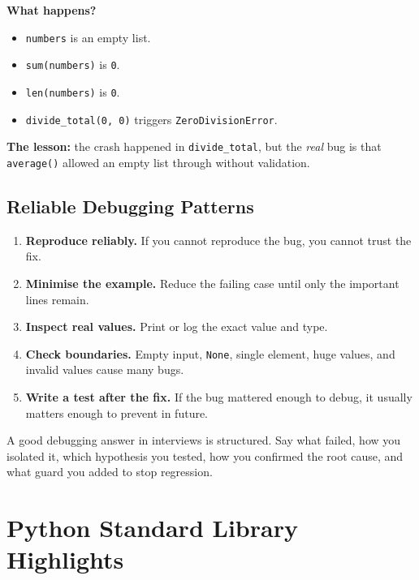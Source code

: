 \documentclass[12pt, a4paper, oneside]{book}
\begin{document}
\textbf{What happens?}
\begin{itemize}[leftmargin=2em]
    \item \texttt{numbers} is an empty list.
    \item \texttt{sum(numbers)} is \texttt{0}.
    \item \texttt{len(numbers)} is \texttt{0}.
    \item \texttt{divide\_total(0, 0)} triggers \texttt{ZeroDivisionError}.
\end{itemize}

\textbf{The lesson:} the crash happened in \texttt{divide\_total}, but the \emph{real} bug is that \texttt{average()} allowed an empty list through without validation.

\subsection{Reliable Debugging Patterns}

\begin{enumerate}[leftmargin=2em]
    \item \textbf{Reproduce reliably.} If you cannot reproduce the bug, you cannot trust the fix.
    \item \textbf{Minimise the example.} Reduce the failing case until only the important lines remain.
    \item \textbf{Inspect real values.} Print or log the exact value and type.
    \item \textbf{Check boundaries.} Empty input, \texttt{None}, single element, huge values, and invalid values cause many bugs.
    \item \textbf{Write a test after the fix.} If the bug mattered enough to debug, it usually matters enough to prevent in future.
\end{enumerate}

\begin{interviewbox}
A good debugging answer in interviews is structured. Say what failed, how you isolated it, which hypothesis you tested, how you confirmed the root cause, and what guard you added to stop regression.
\end{interviewbox}

\section{Python Standard Library Highlights}
\end{document}
